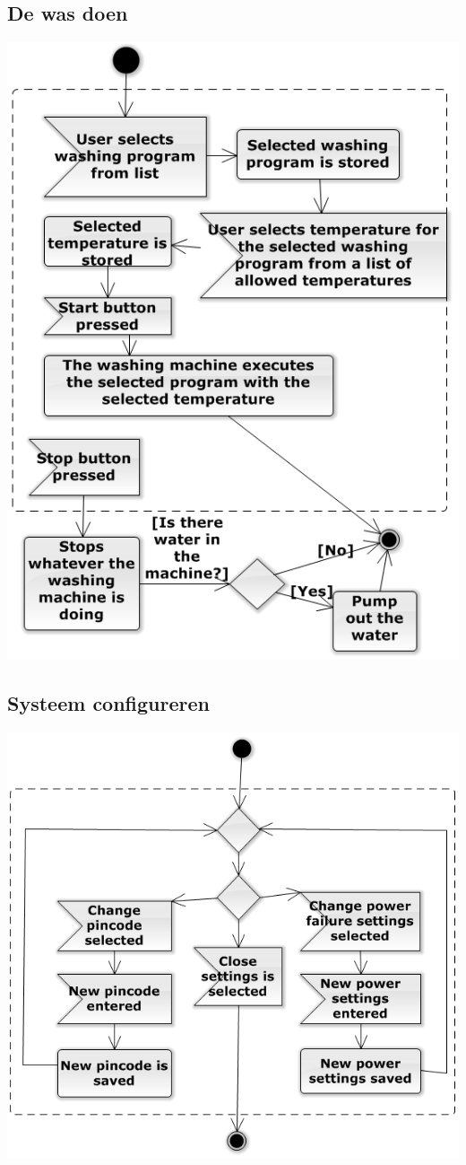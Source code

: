 \subsection{De was doen}
\includegraphics{wasActivity.png}

\subsection{Systeem configureren}
\includegraphics{configureActivity.png}

